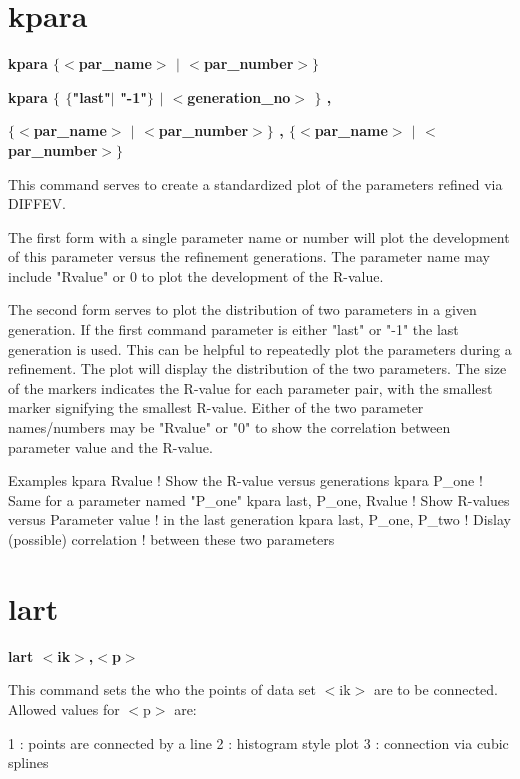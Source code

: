 \section{kpara}
{\bf kpara $ \{$$ <$par\_name$> $ $| $ $ <$par\_number$> $$\} $ \par }
{\bf kpara $ \{$ $ \{$"last"$| $ "-1"$\} $ $| $ $ <$generation\_no$> $ $\} $ , \par }
{\bf       $ \{$$ <$par\_name$> $ $| $ $ <$par\_number$> $$\} $ , $ \{$$ <$par\_name$> $ $| $ $ <$par\_number$> $$\} $ \par }
\par
\vspace{3pt}
This command serves to create a standardized plot of the parameters 
refined via DIFFEV. 
\par
The first form with a single parameter name or number will plot the 
development of this parameter versus the refinement generations. 
The parameter name may include "Rvalue" or 0 to plot the development 
of the R-value. 
\par
The second form serves to plot the distribution of two parameters 
in a given generation. If the first command parameter is either 
"last" or "-1" the last generation is used. This can be helpful to 
repeatedly plot the parameters during a refinement. 
The plot will display the distribution of the two parameters. 
The size of the markers indicates the R-value for each parameter 
pair, with the smallest marker signifying the smallest R-value. 
Either of the two parameter names/numbers may be "Rvalue" or "0" 
to show the correlation between parameter value and the R-value. 
\par
Examples 
kpara Rvalue    ! Show the R-value versus generations 
kpara P\_one     ! Same for a parameter named "P\_one" 
kpara last, P\_one, Rvalue  ! Show R-values versus Parameter value 
                           ! in the last generation 
kpara last, P\_one, P\_two   ! Dislay (possible) correlation 
                           ! between these two parameters 
\section{lart}
{\bf lart $ <$ik$> $,$ <$p$> $ \par }
\par
\vspace{3pt}
This command sets the who the points of data set $ <$ik$> $ are to be 
connected. Allowed values for $ <$p$> $ are: 
\par
\begin{MacVerbatim}
   1 : points are connected by a line
   2 : histogram style plot
   3 : connection via cubic splines
\end{MacVerbatim}
